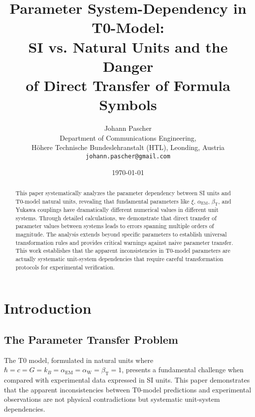 \documentclass[12pt,a4paper]{article}
\newcommand{\xipar}{\xi}
\newcommand{\alphaEM}{\alpha_{\text{EM}}}
\newcommand{\alphaW}{\alpha_{\text{W}}}
\newcommand{\betaT}{\beta_{\text{T}}}
\begin{document}
	
	\title{Parameter System-Dependency in T0-Model: \\
		SI vs. Natural Units and the Danger \\
		of Direct Transfer of Formula Symbols}
	\author{Johann Pascher\\
		Department of Communications Engineering, \\H{\"o}here Technische Bundeslehranstalt (HTL), Leonding, Austria\\
		\texttt{johann.pascher@gmail.com}}
	\date{\today}
	
	\maketitle
	
	\begin{abstract}
		This paper systematically analyzes the parameter dependency between SI units and T0-model natural units, revealing that fundamental parameters like $\xipar$, $\alphaEM$, $\betaT$, and Yukawa couplings have dramatically different numerical values in different unit systems. Through detailed calculations, we demonstrate that direct transfer of parameter values between systems leads to errors spanning multiple orders of magnitude. The analysis extends beyond specific parameters to establish universal transformation rules and provides critical warnings against naive parameter transfer. This work establishes that the apparent inconsistencies in T0-model parameters are actually systematic unit-system dependencies that require careful transformation protocols for experimental verification.
	\end{abstract}
	
	\tableofcontents
	\newpage
	
	\section{Introduction}
	\label{sec:introduction}
	
	\subsection{The Parameter Transfer Problem}
	\label{subsec:parameter_problem}
	
	The T0 model, formulated in natural units where $\hbar = c = G = k_B = \alphaEM = \alphaW = \betaT = 1$, presents a fundamental challenge when compared with experimental data expressed in SI units. This paper demonstrates that the apparent inconsistencies between T0-model predictions and experimental observations are not physical contradictions but systematic unit-system dependencies.
	
\end{document}

